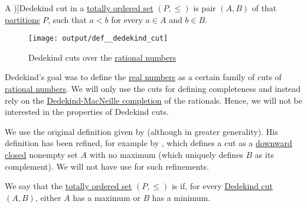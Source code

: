 \begin{definition}\label{def:dedekind_cut}
  A \term[ru=Дедекиндово сечение (\cite[34]{Александров1977Введение})]{Dedekind cut} in a \hyperref[def:totally_ordered_set]{totally ordered set} \( (P, \leq) \) is pair \( (A, B) \) of  that \hyperref[def:set_partition]{partitions} \( P \), such that \( a < b \) for every \( a \in A \) and \( b \in B \).

  \begin{figure}[!ht]
    \centering
    \texttt{[image: output/def\_\_dedekind\_cut]}
    \caption{Dedekind cuts over the \hyperref[def:rational_numbers]{rational numbers}}
    \label{fig:def:dedekind_cut}
  \end{figure}
\end{definition}
\begin{comments}
  \item Dedekind's goal was to define the \hyperref[def:real_numbers]{real numbers} as a certain family of cuts of \hyperref[def:rational_numbers]{rational numbers}. We will only use the cuts for defining completeness and instead rely on the \hyperref[def:dedekind_macnielle_completion]{Dedekind-MacNeille completion} of the rationals. Hence, we will not be interested in the properties of Dedekind cuts.

  \item We use the original definition given by  (although in greater generality). His definition has been refined, for example by , which defines a cut as a \hyperref[def:closed_ordered_subset]{downward closed} nonempty set \( A \) with no maximum (which uniquely defines \( B \) as its complement). We will not have use for such refinements.
\end{comments}

\begin{definition}\label{def:dedekind_completeness}
  We say that the \hyperref[def:totally_ordered_set]{totally ordered set} \( (P, \leq) \) is  if, for every \hyperref[def:dedekind_cut]{Dedekind cut} \( (A, B) \), either \( A \) has a maximum or \( B \) has a minimum.
\end{definition}

